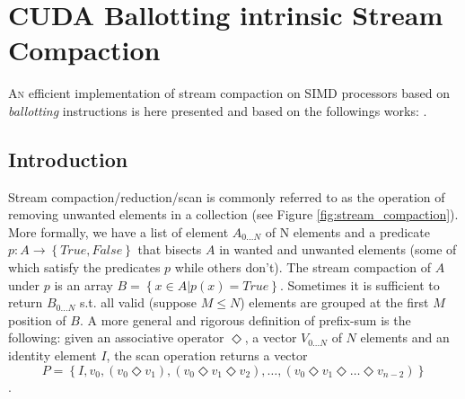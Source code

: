 \chapter{CUDA Ballotting intrinsic Stream Compaction}
\label{ch:stream_compaction}

\lettrine[lines=3,lhang=0.33,lraise=0,loversize=0.15]{A}{n} efficient implementation of stream compaction on SIMD processors based on \textit{ballotting} instructions is here presented and based on the followings works: \cite{Billetter:2009,Hughes}.
\section{Introduction}
Stream compaction/reduction/scan is commonly referred to as the operation of removing unwanted elements in a collection (see Figure \ref{fig:stream_compaction}). More formally, we have a list of element \(A_{0...N}\) of N elements and a predicate \(p : A \to\left \{ True,False\right \} \) that bisects \(A\) in wanted and unwanted elements (some of which satisfy the predicates \(p\) while others don't). The stream compaction of \(A\) under \(p\) is an array \(B=\left\{x \in A | p(x) = True\right\}\). Sometimes it is sufficient to return \(B_{0\ldots N}\) s.t. all valid (suppose \(M \leq N\)) elements are grouped at the first \(M\) position of \(B\). 
A more general  and rigorous  definition  of prefix-sum  is the following: given an associative operator \(\Diamond\), a vector \(V_{0\ldots N}\) of \(N\) elements and an identity element \(I\), the scan operation returns a vector 
\[P=\left\{I,v_0,(v_0 \Diamond v_1),(v_0 \Diamond v_1 \Diamond v_2),\ldots,(v_0\Diamond v_1 \Diamond \ldots \Diamond v_{n-2})\right\}\].

